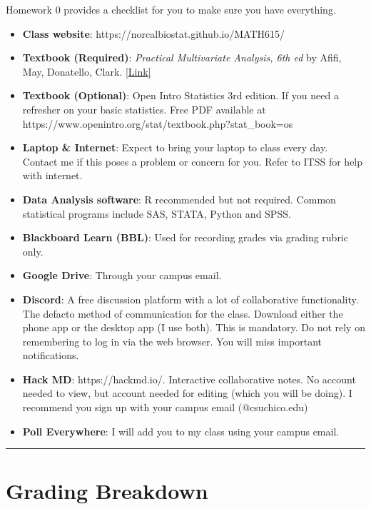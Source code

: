 \documentclass[
  letterpaper,
  DIV=11,
  numbers=noendperiod]{scrartcl}
\providecommand{\tightlist}{%
  \setlength{\itemsep}{0pt}\setlength{\parskip}{0pt}}\usepackage{longtable,booktabs,array}
\begin{document}
Homework 0 provides a checklist for you to make sure you have
everything.

\begin{itemize}
\tightlist
\item
  \textbf{Class website}: https://norcalbiostat.github.io/MATH615/
\item
  \textbf{Textbook (Required)}: \emph{Practical Multivariate Analysis,
  6th ed} by Afifi, May, Donatello, Clark.
  \href{https://www.routledge.com/Practical-Multivariate-Analysis/Afifi-May-Donatello-Clark/p/book/9781032088471}{{[}Link{]}}
\item
  \textbf{Textbook (Optional)}: Open Intro Statistics 3rd edition. If
  you need a refresher on your basic statistics. Free PDF available at
  https://www.openintro.org/stat/textbook.php?stat\_book=os
\item
  \textbf{Laptop \& Internet}: Expect to bring your laptop to class
  every day. Contact me if this poses a problem or concern for you.
  Refer to ITSS for help with internet.
\item
  \textbf{Data Analysis software}: R recommended but not required.
  Common statistical programs include SAS, STATA, Python and SPSS.
\item
  \textbf{Blackboard Learn (BBL)}: Used for recording grades via grading
  rubric only.
\item
  \textbf{Google Drive}: Through your campus email.
\item
  \textbf{Discord}: A free discussion platform with a lot of
  collaborative functionality. The defacto method of communication for
  the class. Download either the phone app or the desktop app (I use
  both). This is mandatory. Do not rely on remembering to log in via the
  web browser. You will miss important notifications.
\item
  \textbf{Hack MD}: https://hackmd.io/. Interactive collaborative notes.
  No account needed to view, but account needed for editing (which you
  will be doing). I recommend you sign up with your campus email
  (@csuchico.edu)
\item
  \textbf{Poll Everywhere}: I will add you to my class using your campus
  email.
\end{itemize}

\begin{center}\rule{0.5\linewidth}{0.5pt}\end{center}

\hypertarget{grading-breakdown}{%
\section{Grading Breakdown}\label{grading-breakdown}}
\end{document}
